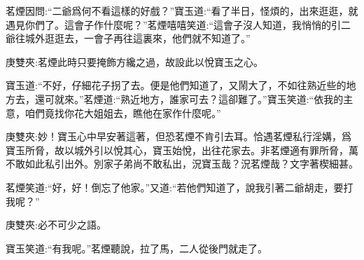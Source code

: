 \begin{parag}
    茗煙因問:“二爺爲何不看這樣的好戲？”寶玉道:“看了半日，怪煩的，出來逛逛，就遇見你們了。這會子作什麼呢？”茗煙嘻嘻笑道:“這會子沒人知道，我悄悄的引二爺往城外逛逛去，一會子再往這裏來，他們就不知道了。”\begin{note}庚雙夾:茗煙此時只要掩飾方纔之過，故設此以悅寶玉之心。\end{note}寶玉道:“不好，仔細花子拐了去。便是他們知道了，又鬧大了，不如往熟近些的地方去，還可就來。”茗煙道:“熟近地方，誰家可去？這卻難了。”寶玉笑道:“依我的主意，咱們竟找你花大姐姐去，瞧他在家作什麼呢。”\begin{note}庚雙夾:妙！寶玉心中早安著這著，但恐茗煙不肯引去耳。恰遇茗煙私行淫媾，爲寶玉所脅，故以城外引以悅其心，寶玉始悅，出往花家去。非茗煙適有罪所脅，萬不敢如此私引出外。別家子弟尚不敢私出，況寶玉哉？況茗煙哉？文字著楔細甚。\end{note}茗煙笑道:“好，好！倒忘了他家。”又道:“若他們知道了，說我引著二爺胡走，要打我呢？”\begin{note}庚雙夾:必不可少之語。\end{note}寶玉笑道:“有我呢。”茗煙聽說，拉了馬，二人從後門就走了。
\end{parag}



